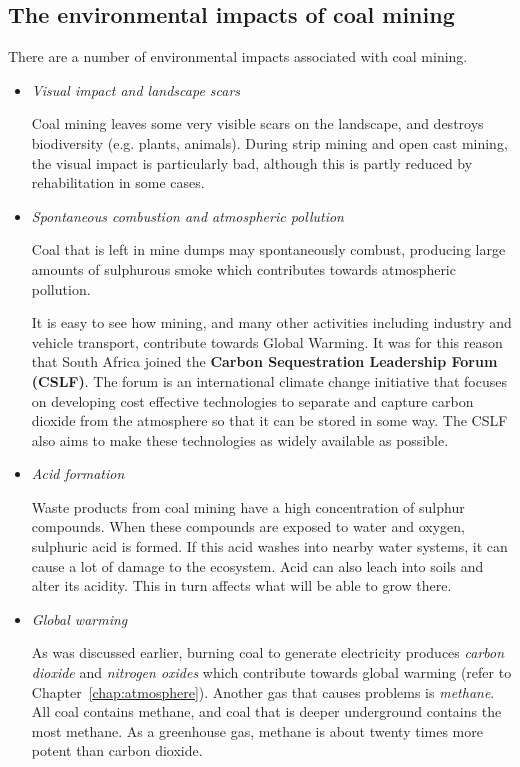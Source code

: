 \subsection{The environmental impacts of coal mining}

There are a number of environmental impacts associated with coal mining.

\begin{itemize}
\item{\textit{Visual impact and landscape scars}

Coal mining leaves some very visible scars on the landscape, and destroys biodiversity (e.g.\@{} plants, animals). During strip mining and open cast mining, the visual impact is particularly bad, although this is partly reduced by rehabilitation in some cases.
}

\item{\textit{Spontaneous combustion and atmospheric pollution}

Coal that is left in mine dumps may spontaneously combust, producing large amounts of sulphurous smoke which contributes towards atmospheric pollution.}

\begin{IFact}{It is easy to see how mining, and many other activities including industry and vehicle transport, contribute towards Global Warming. It was for this reason that South Africa joined the \textbf{Carbon Sequestration Leadership Forum (CSLF)}. The forum is an international climate change initiative that focuses on developing cost effective technologies to separate and capture carbon dioxide from the atmosphere so that it can be stored in some way. The CSLF also aims to make these technologies as widely available as possible.
}
\end{IFact}

\item{\textit{Acid formation}

Waste products from coal mining have a high concentration of sulphur compounds. When these compounds are exposed to water and oxygen, sulphuric acid is formed. If this acid washes into nearby water systems, it can cause a lot of damage to the ecosystem. Acid can also leach into soils and alter its acidity. This in turn affects what will be able to grow there.
}

\item{\textit{Global warming}

As was discussed earlier, burning coal to generate electricity produces \textit{carbon dioxide} and \textit{nitrogen oxides} which contribute towards global warming (refer to Chapter~\ref{chap:atmosphere}). Another gas that causes problems is \textit{methane}. All coal contains methane, and coal that is deeper underground contains the most methane. As a greenhouse gas, methane is about twenty times more potent than carbon dioxide.
}
\end{itemize}
